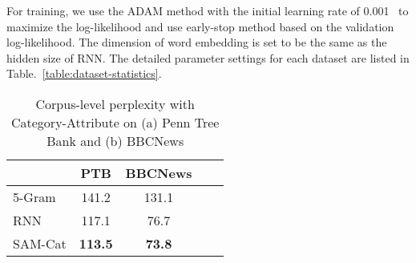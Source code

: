 \documentclass[a4paper]{article}
\newcommand{\method}{\xspace{SAM}}
\begin{document}

For training, we use the ADAM method with the initial learning rate of 0.001~\cite{kingma2014adam} to maximize the log-likelihood and use early-stop method based on the validation log-likelihood. The dimension of word embedding is set to be the same as the hidden size of RNN. The detailed parameter settings for each dataset are listed in Table.~\ref{table:dataset-statistics}.
\begin{table}[ht]
\caption{Corpus-level perplexity with Category-Attribute on (a) Penn Tree Bank and (b) BBCNews}
\label{table:language-modeling-category}
\begin{center}
\setlength\tabcolsep{3pt}
\begin{tabular}{l|cccc}
\hline\hline
& PTB & BBCNews\\
 \hline
5-Gram&141.2&131.1\\
RNN&117.1 &76.7\\
\method-Cat&\textbf{113.5}&\textbf{73.8}\\

 \hline\hline
\end{tabular}
\end{center}
\vspace{-0.2cm}
\end{table}
\end{document}
